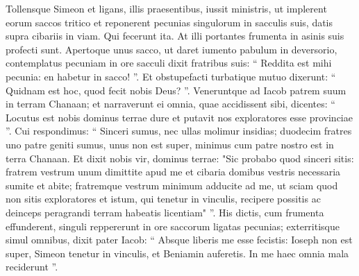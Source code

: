 \begin{biblechapter}
\begin{biblechapter}
\begin{biblechapter}
\begin{biblechapter}
\begin{biblechapter}
\begin{biblechapter}
\begin{biblechapter}
\begin{biblechapter}
\begin{biblechapter}
\begin{biblechapter}
\begin{biblechapter}
\begin{biblechapter}
\begin{biblechapter}
\begin{biblechapter}
\begin{biblechapter}
\begin{biblechapter}
\begin{biblechapter}
\begin{biblechapter}
\begin{biblechapter}
\begin{biblechapter}
\begin{biblechapter}
\begin{biblechapter}
\begin{biblechapter}
\begin{biblechapter}
\begin{biblechapter}
\begin{biblechapter}
\begin{biblechapter}
\begin{biblechapter}
\begin{biblechapter}
\begin{biblechapter}
\begin{biblechapter}
\begin{biblechapter}
\begin{biblechapter}
\begin{biblechapter}
\begin{biblechapter}
\begin{biblechapter}
\begin{biblechapter}
\begin{biblechapter}
\begin{biblechapter}
\begin{biblechapter}
\begin{biblechapter}
\begin{biblechapter}
 \verse Tollensque Simeon et ligans, illis praesentibus, iussit ministris, ut implerent eorum saccos tritico et reponerent pecunias singulorum in sacculis suis, datis supra cibariis in viam. Qui fecerunt ita.
 \verse At illi portantes frumenta in asinis suis profecti sunt. 
\verse Apertoque unus sacco, ut daret iumento pabulum in deversorio, contemplatus pecuniam in ore sacculi 
\verse dixit fratribus suis: “ Reddita est mihi pecunia: en habetur in sacco! ”. Et obstupefacti turbatique mutuo dixerunt: “ Quidnam est hoc, quod fecit nobis Deus? ”.
 \verse Veneruntque ad Iacob patrem suum in terram Chanaan; et narraverunt ei omnia, quae accidissent sibi, dicentes: 
\verse “ Locutus est nobis dominus terrae dure et putavit nos exploratores esse provinciae ”. 
\verse Cui respondimus: “ Sinceri sumus, nec ullas molimur insidias; 
\verse duodecim fratres uno patre geniti sumus, unus non est super, minimus cum patre nostro est in terra Chanaan. 
\verse Et dixit nobis vir, dominus terrae: "Sic probabo quod sinceri sitis: fratrem vestrum unum dimittite apud me et cibaria domibus vestris necessaria sumite et abite; 
\verse fratremque vestrum minimum adducite ad me, ut sciam quod non sitis exploratores et istum, qui tenetur in vinculis, recipere possitis ac deinceps peragrandi terram habeatis licentiam" ”.
 \verse His dictis, cum frumenta effunderent, singuli reppererunt in ore saccorum ligatas pecunias; exterritisque simul omnibus, 
\verse dixit pater Iacob: “ Absque liberis me esse fecistis: Ioseph non est super, Simeon tenetur in vinculis, et Beniamin auferetis. In me haec omnia mala reciderunt ”. 

\end{biblechapter}
\end{biblechapter}
\end{biblechapter}
\end{biblechapter}
\end{biblechapter}
\end{biblechapter}
\end{biblechapter}
\end{biblechapter}
\end{biblechapter}
\end{biblechapter}
\end{biblechapter}
\end{biblechapter}
\end{biblechapter}
\end{biblechapter}
\end{biblechapter}
\end{biblechapter}
\end{biblechapter}
\end{biblechapter}
\end{biblechapter}
\end{biblechapter}
\end{biblechapter}
\end{biblechapter}
\end{biblechapter}
\end{biblechapter}
\end{biblechapter}
\end{biblechapter}
\end{biblechapter}
\end{biblechapter}
\end{biblechapter}
\end{biblechapter}
\end{biblechapter}
\end{biblechapter}
\end{biblechapter}
\end{biblechapter}
\end{biblechapter}
\end{biblechapter}
\end{biblechapter}
\end{biblechapter}
\end{biblechapter}
\end{biblechapter}
\end{biblechapter}
\end{biblechapter}
